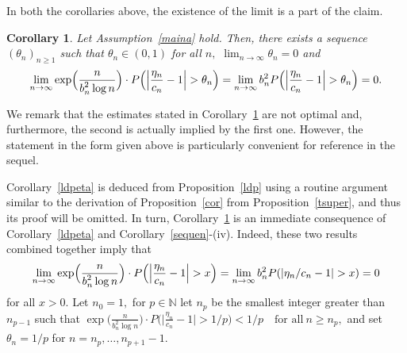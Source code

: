 \documentclass[12pt]{amsart}
\newtheorem{corollary}[theorem]{Corollary}
\begin{document}
In both the corollaries above, the existence of the limit is a part of the claim.
\begin{corollary}
\label{weakdelta} Let Assumption~\ref{maina} hold. Then, there
exists a sequence $(\theta_n)_{n\geq 1}$ such that
$\theta_n\in(0,1)$ for all $n,$ $\lim_{n\to\infty} \theta_n=0$ and
\begin{eqnarray*} \lim_{n\to\infty} \exp\Bigl({\frac {\displaystyle {n}}{\displaystyle {b_n^2\log n} }}\Bigr)\cdot
P\Bigl(\Bigl|\frac{\eta_n}{c_n}-1\Bigr|>\theta_n\Bigr)=
\lim_{n\to\infty} b_n^2
P\Bigl(\Bigl|\frac{\eta_n}{c_n}-1\Bigr|>\theta_n\Bigr)=0. \end{eqnarray*}
\end{corollary}
We remark that the estimates stated in Corollary~\ref{weakdelta} are
not optimal and, furthermore, the second is actually implied by the
first one. However, the statement in the form given above is
particularly convenient for reference in the sequel.
\par
Corollary~\ref{ldpeta} is deduced from Proposition~\ref{ldp} using a
routine argument similar to the derivation of Proposition~\ref{cor}
from Proposition~\ref{tsuper}, and thus its proof will be omitted.
In turn, Corollary~\ref{weakdelta} is an immediate consequence of
Corollary~\ref{ldpeta} and Corollary~\ref{sequen}-(iv). Indeed,
these two results combined together imply that \begin{eqnarray*}
\lim_{n\to\infty} \exp\Bigl({\frac {\displaystyle {n}}{\displaystyle {b_n^2\log n} }}\Bigr)\cdot
P\Bigl(\Bigl|\frac{\eta_n}{c_n}-1\Bigr|>x\Bigr) =\lim_{n\to\infty}
b_n^2 P(|\eta_n/c_n -1|> x)=0 \end{eqnarray*} for all $x>0.$ Let $n_0=1,$ for
$p\in {{\mathbb N}}$ let $n_p$ be the smallest integer greater than $n_{p-1}$
such that $\exp\bigl(\frac{n}{b_n^2\log n}\bigr)\cdot
P\bigl(\bigl|\frac{\eta_n}{c_n}-1\bigr|>1/p\bigr)<1/p\quad\mbox{for
all}~n\geq n_p,$ and set $\theta_n=1/p$ for
$n=n_p,\ldots,n_{p+1}-1.$
\par
\end{document}
